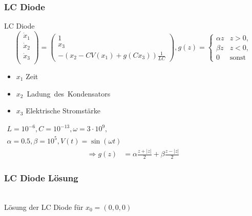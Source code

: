 \begin{frame}[<+->]
\frametitle{LC Diode}
\begin{block}{LC Diode}
\vspace*{-0.3cm}
\[
 \begin{pmatrix}
  \dot x_1\\
  \dot x_2\\
  \dot x_3\\
 \end{pmatrix}
 = 
 \begin{pmatrix}
  1\\
  x_3\\
  -\left(x_2-CV(x_1) + g(Cx_3)\right)\frac{1}{LC}
 \end{pmatrix},
 g(z) = \begin{cases}
      \alpha z & z> 0,\\
      \beta z & z< 0,\\
0 & \text{sonst}
      \end{cases}
\]
\end{block}
\begin{minipage}{0.45\linewidth}

\end{minipage}
\begin{minipage}{0.45\linewidth}
\centering
\begin{itemize}
\item $x_1$ Zeit
 \item $x_2$~Ladung~des~Kondensators
 \item $x_3$ Elektrische Stromstärke
\end{itemize}
 $\begin{aligned}
L= 10^{-6}, C=10^{-13}, \omega=3\cdot 10^{9},\\
\alpha =0.5,\beta=10^{5}, V(t) = \sin(\omega t)   
  \end{aligned}
$
 \pause
\begin{align*}
 \Rightarrow g(z) &= \alpha\frac{z+|z|}{2} + \beta\frac{z-|z|}{2}
 \end{align*}
\end{minipage}
 \end{frame}
 \begin{frame}[<+->]
\frametitle{LC Diode Lösung}
\begin{minipage}{0.45\linewidth}
  
\end{minipage}  
\begin{minipage}{0.45\linewidth}
  
\end{minipage}
\centering
\\[0.3cm]
Lösung der LC Diode für $x_0=(0,0,0)$
\end{frame}

